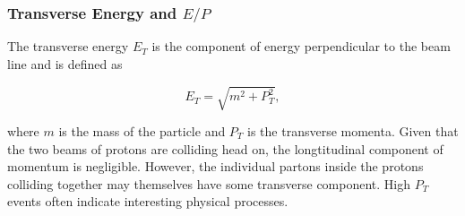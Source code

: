 \documentclass{article}
\begin{document}
\subsubsection{Transverse Energy and $E/P$}

The transverse energy $E_T$ is the component of energy perpendicular to the beam line and is defined as 

\begin{equation}
E_{T} = \sqrt{m^2 + P_{T}^2},
\end{equation}

where $m$ is the mass of the particle and $P_T$ is the transverse momenta. Given that the two beams of protons are colliding head on, the longtitudinal component of momentum is negligible. However, the individual partons inside the protons colliding together may themselves have some transverse component. High $P_T$ events often indicate interesting physical processes.
\end{document}
